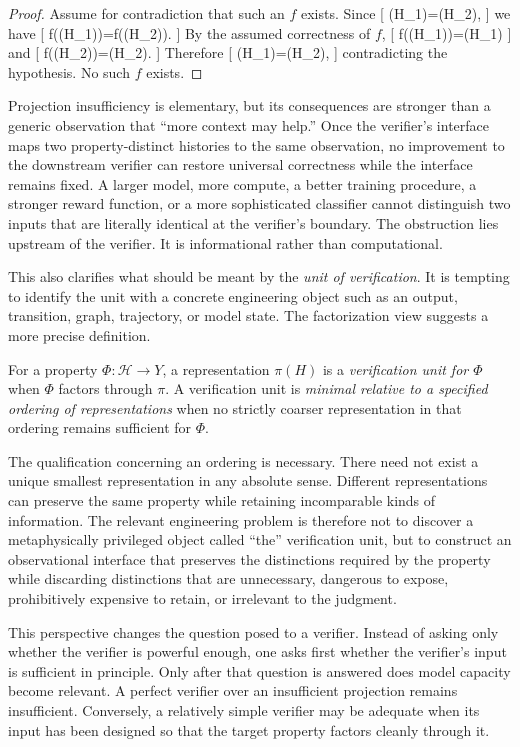 \documentclass[11pt]{article}
\newcommand{\Hist}{\mathcal{H}} \newcommand{\States}{\mathcal{S}} \newcommand{\Actions}{\mathcal{A}} \newcommand{\Obs}{\mathcal{O}} \newcommand{\Img}{\operatorname{Im}}
\begin{document}
\begin{proof} Assume for contradiction that such an $f$ exists. Since [ \pi(H_1)=\pi(H_2), ] we have [ f(\pi(H_1))=f(\pi(H_2)). ] By the assumed correctness of $f$, [ f(\pi(H_1))=\Phi(H_1) ] and [ f(\pi(H_2))=\Phi(H_2). ] Therefore [ \Phi(H_1)=\Phi(H_2), ] contradicting the hypothesis. No such $f$ exists. \end{proof}

Projection insufficiency is elementary, but its consequences are stronger than a generic observation that ``more context may help.'' Once the verifier's interface maps two property-distinct histories to the same observation, no improvement to the downstream verifier can restore universal correctness while the interface remains fixed. A larger model, more compute, a better training procedure, a stronger reward function, or a more sophisticated classifier cannot distinguish two inputs that are literally identical at the verifier's boundary. The obstruction lies upstream of the verifier. It is informational rather than computational.

This also clarifies what should be meant by the \emph{unit of verification}. It is tempting to identify the unit with a concrete engineering object such as an output, transition, graph, trajectory, or model state. The factorization view suggests a more precise definition.

\begin{definition} For a property $\Phi:\Hist\rightarrow Y$, a representation $\pi(H)$ is a \emph{verification unit for $\Phi$} when $\Phi$ factors through $\pi$. A verification unit is \emph{minimal relative to a specified ordering of representations} when no strictly coarser representation in that ordering remains sufficient for $\Phi$. \end{definition}

The qualification concerning an ordering is necessary. There need not exist a unique smallest representation in any absolute sense. Different representations can preserve the same property while retaining incomparable kinds of information. The relevant engineering problem is therefore not to discover a metaphysically privileged object called ``the'' verification unit, but to construct an observational interface that preserves the distinctions required by the property while discarding distinctions that are unnecessary, dangerous to expose, prohibitively expensive to retain, or irrelevant to the judgment.

This perspective changes the question posed to a verifier. Instead of asking only whether the verifier is powerful enough, one asks first whether the verifier's input is sufficient in principle. Only after that question is answered does model capacity become relevant. A perfect verifier over an insufficient projection remains insufficient. Conversely, a relatively simple verifier may be adequate when its input has been designed so that the target property factors cleanly through it.
\end{document}
